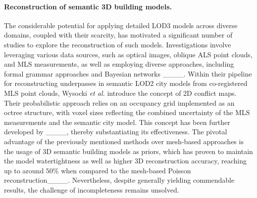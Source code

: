 \paragraph{Reconstruction of semantic 3D building models.}
The considerable potential for applying detailed \gls{LOD}3 models across diverse domains, coupled with their scarcity, has motivated a significant number of studies to explore the reconstruction of such models.
Investigations involve leveraging various data sources, such as optical images, oblique \gls{ALS} point clouds, and \gls{MLS} measurements, as well as employing diverse approaches, including formal grammar approaches and Bayesian networks ____.
Within their pipeline for reconstructing underpasses in semantic \gls{LOD}2 city models from co-registered \gls{MLS} point clouds, Wysocki \textit{et al.} introduce the concept of 2D conflict maps. 
Their probabilistic approach relies on an occupancy grid implemented as an octree structure, with voxel sizes reflecting the combined uncertainty of the \gls{MLS} measurements and the semantic city model.
This concept has been further developed by ____, thereby substantiating its effectiveness.
The pivotal advantage of the previously mentioned methods over mesh-based approaches is the usage of 3D semantic building models as priors, which has proven to maintain the model watertightness as well as higher 3D reconstruction accuracy, reaching up to around $50\%$ when compared to the mesh-based Poisson reconstruction____. 
Nevertheless, despite generally yielding commendable results, the challenge of incompleteness remains unsolved.


